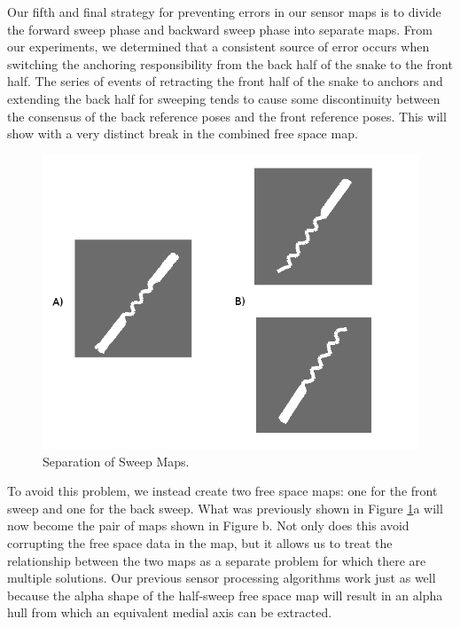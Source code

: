 Our fifth and final strategy for preventing errors in our sensor maps is to divide the forward sweep phase and backward sweep phase into separate maps.  From our experiments, we determined that a consistent source of error occurs when switching the anchoring responsibility from the back half of the snake to the front half.  The series of events of retracting the front half of the snake to anchors and extending the back half for sweeping tends to cause some discontinuity between the consensus of the back reference poses and the front reference poses.  This will show with a very distinct break in the combined free space map.

\begin{figure}
  \begin{center}
    \includegraphics[scale=0.6]{4_sweepmap_1.png}
  \end{center}
  \caption{Separation of Sweep Maps.}
	\label{ref_sweep_sep}
\end{figure}

To avoid this problem, we instead create two free space maps: one for the front sweep and one for the back sweep.  What was previously shown in Figure \ref{ref_sweep_sep}a will now become the pair of maps shown in Figure b.  Not only does this avoid corrupting the free space data in the map, but it allows us to treat the relationship between the two maps as a separate problem for which there are multiple solutions.  Our previous sensor processing algorithms work just as well because the alpha shape of the half-sweep free space map will result in an alpha hull from which an equivalent medial axis can be extracted.  

